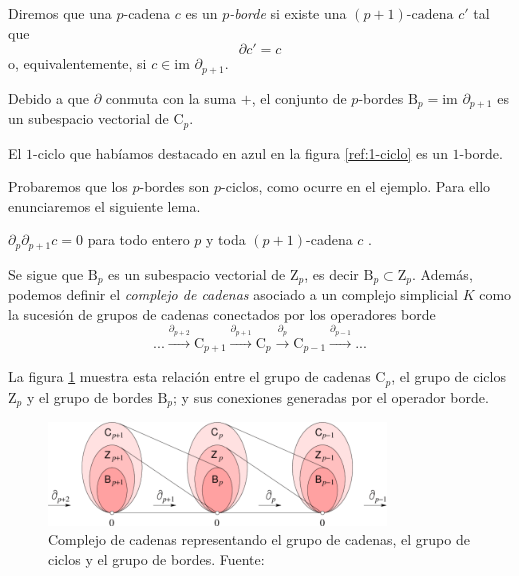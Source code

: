 \begin{definition}
\begin{sloppypar}
Diremos que una $p$-cadena $c$ es un \emph{$p$-borde} si existe una ${(p+1)\text{-cadena}}$ $c'$ tal que
\[
\partial c' = c
\]
o, equivalentemente, si $c \in \text{im }\partial_{p+1}$.
\end{sloppypar}
\end{definition}

Debido a que $\partial$ conmuta con la suma $+$, el conjunto de $p$-bordes $\text{B}_p = \text{im }\partial_{p+1}$ es un subespacio vectorial de $\text{C}_p$.

\begin{exmp}
El $1$-ciclo que habíamos destacado en azul en la figura \ref{ref:1-ciclo} es un $1$-borde.
\end{exmp}

Probaremos que los $p$-bordes son $p$-ciclos, como ocurre en el ejemplo. Para ello enunciaremos el siguiente lema.

\begin{lemma}
$\partial_p \partial_{p+1} c = 0$ para todo entero $p$ y toda $(p + 1)$-cadena $c$ \cite{libroEH}.
\end{lemma}

Se sigue que $\text{B}_p$ es un subespacio vectorial de $\text{Z}_p$, es decir $\text{B}_p \subset \text{Z}_p$. Además, podemos definir el \emph{complejo de cadenas} asociado a un complejo simplicial $K$ como la sucesión de grupos de cadenas conectados por los operadores borde
\[
...\overset{\partial_{p+2}}{\longrightarrow}\text{C}_{p+1}\overset{\partial_{p+1}}{\longrightarrow}\text{C}_{p}\overset{\partial_{p}}{\longrightarrow}\text{C}_{p-1}\overset{\partial_{p-1}}{\longrightarrow}...
\]

La figura \ref{ref:gruposCadenasOpBorde} muestra esta relación entre el grupo de cadenas $\text{C}_p$, el grupo de ciclos $\text{Z}_p$ y el grupo de bordes $\text{B}_p$; y sus conexiones generadas por el operador borde.

\begin{figure}[!ht]
\centering
\includegraphics[width=0.8\textwidth]{include/figuras/The-chain-complex-consisting-of-a-linear-sequence-of-chain-cycle-and-boundary-groups.png} 
\caption{Complejo de cadenas representando el grupo de cadenas, el grupo de ciclos y el grupo de bordes. Fuente: \cite{libroEH}}
\label{ref:gruposCadenasOpBorde}
\end{figure}


